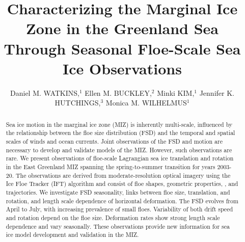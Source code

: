 \documentclass[review, jog]{igs}
\begin{document}
\title[Floe-scale sea ice motion]{Characterizing the Marginal Ice Zone in the Greenland Sea Through Seasonal Floe-Scale Sea Ice Observations}

\author[Watkins and others]{Daniel M. WATKINS,$^1$ 
  Ellen M. BUCKLEY,$^2$ Minki KIM,$^1$ 
  Jennifer K. HUTCHINGS,$^3$
  Monica M. WILHELMUS$^1$}


\begin{frontmatter}
\maketitle

\begin{abstract}
Sea ice motion in the marginal ice zone (MIZ) is inherently multi-scale, influenced by the relationship between the floe size distribution (FSD) and the temporal and spatial scales of winds and ocean currents. Joint observations of the FSD and motion are necessary to develop and validate models of the MIZ. However, such observations are rare.
We present observations of floe-scale Lagrangian sea ice translation and rotation in the East Greenland MIZ spanning the spring-to-summer transition for years 2003-20.
The observations are derived from moderate-resolution optical imagery using the Ice Floe Tracker (IFT) algorithm and consist of floe shapes, geometric properties, , and trajectories. We investigate FSD seasonality, links between floe size, translation, and rotation, and length scale dependence of horizontal deformation. The FSD evolves from April to July, with increasing prevalence of small floes. Variability of both drift speed and rotation depend on the floe size.  Deformation rates show strong length scale dependence and vary seasonally.  These observations provide new information for sea ice model development and validation in the MIZ.
\end{abstract}
\end{frontmatter}
\end{document}

